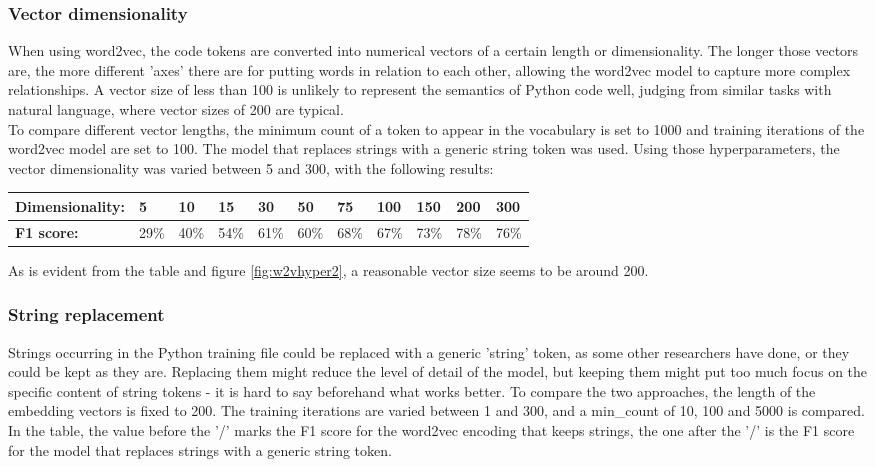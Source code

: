 \documentclass[
a4paper,
pagesize,
pdftex,
12pt,
twoside, %
BCOR=5mm, %
ngerman,
fleqn,
final,
]{scrartcl}
\begin{document}
	\subsubsection{Vector dimensionality}
	When using word2vec, the code tokens are converted into numerical vectors of a certain length or dimensionality. The longer those vectors are, the more different 'axes' there are for putting words in relation to each other, allowing the word2vec model to capture more complex relationships. A vector size of less than 100 is unlikely to represent the semantics of Python code well, judging from similar tasks with natural language, where vector sizes of 200 are typical.\\
	To compare different vector lengths, the minimum count of a token to appear in the vocabulary is set to 1000 and training iterations of the word2vec model are set to 100. The model that replaces strings with a generic string token was used. Using those hyperparameters, the vector dimensionality was varied between 5 and 300, with the following results:	
	
	\begin{tabular}{| p{3.5cm}  | p{0.6cm} | p{0.6cm} | p{0.6cm} | p{0.6cm} | p{0.6cm} | p{0.6cm} | p{0.8cm} | p{0.8cm} | p{0.8cm} | p{0.8cm} | }
		\hline
		\textbf{Dimensionality:} & 5 & 10 & 15 & 30 & 50 & 75 & 100 & 150 & 200 & 300 \\
		\hline
		
		\textbf{F1 score:} & 29\% & 40\% & 54\% & 61\% & 60\% & 68\% & 67\% & 73\% & 78\% & 76\% \\
		\hline
		\hline
	\end{tabular}
	
	As is evident from the table and figure \ref{fig:w2vhyper2}, a reasonable vector size seems to be around 200. 	
	
	\subsubsection{String replacement}
	
	Strings occurring in the Python training file could be replaced with a generic 'string' token, as some other researchers have done, or they could be kept as they are. Replacing them might reduce the level of detail of the model, but keeping them might put too much focus on the specific content of string tokens - it is hard to say beforehand what works better. To compare the two approaches, the length of the embedding vectors is fixed to 200. The training iterations are varied between 1 and 300, and a min\_count of 10, 100 and 5000 is compared.\\
	In the table, the value before the '/' marks the F1 score for the word2vec encoding that keeps strings, the one after the '/' is the F1 score for the model that replaces strings with a generic string token. 
	
\end{document}
